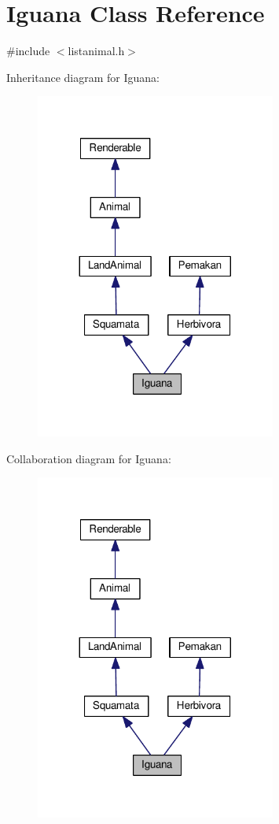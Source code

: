 \hypertarget{classIguana}{}\section{Iguana Class Reference}
\label{classIguana}


{\ttfamily \#include $<$listanimal.\+h$>$}



Inheritance diagram for Iguana\+:
\nopagebreak
\begin{figure}[H]
\begin{center}
\leavevmode
\includegraphics[width=224pt]{classIguana__inherit__graph}
\end{center}
\end{figure}


Collaboration diagram for Iguana\+:
\nopagebreak
\begin{figure}[H]
\begin{center}
\leavevmode
\includegraphics[width=224pt]{classIguana__coll__graph}
\end{center}
\end{figure}
